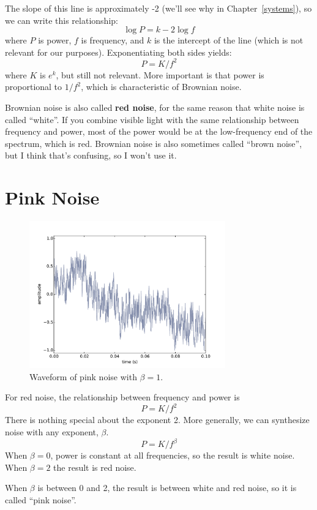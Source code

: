\documentclass[12pt]{book}
\begin{document}
The slope of this line is approximately -2 (we'll see why in
Chapter~\ref{systems}), so we can write this relationship:
%
\[ \log P = k -2 \log f \]
%
where $P$ is power, $f$ is frequency, and $k$ is the intercept
of the line (which is not relevant for our purposes).
Exponentiating both sides yields:
%
\[ P = K / f^{2} \]
%
where $K$ is $e^k$, but still not relevant.  More important is
that power is proportional to $1/f^2$, which is characteristic
of Brownian noise.

Brownian noise is also called {\bf red noise}, for the same reason that
white noise is called ``white''.  If you combine visible light with
the same relationship between frequency and power, most of the power
would be at the low-frequency end of the spectrum, which is red.
Brownian noise is also sometimes called ``brown noise'', but I think
that's confusing, so I won't use it.


\section{Pink Noise}
\label{pink}

\begin{figure}
\centerline{\includegraphics[height=2.5in]{figs/pinknoise0.pdf}}
\caption{Waveform of pink noise with $\beta=1$.}
\label{fig.pinknoise0}
\end{figure}

For red noise, the relationship between frequency
and power is
%
\[ P = K / f^{2} \]
%
There is nothing special about the exponent 2.  More generally,
we can synthesize noise with any exponent, $\beta$.
%
\[ P = K / f^{\beta} \]
%
When $\beta = 0$, power is constant at all frequencies,
so the result is white noise.  When $\beta=2$ the result is red noise.

When $\beta$ is between 0 and 2, the result is between white and
red noise, so it is called ``pink noise''.
\end{document}
